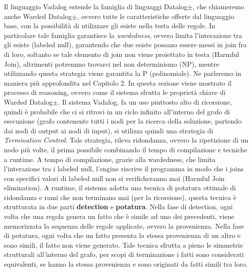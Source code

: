 Il linguaggio Vadalog estende la famiglia di linguaggi Datalog$\pm $, che chiameremo anche Warded Datalog$\pm $, ovvero tutte le caratteristiche offerte dal linguaggio base, con la possibilità di utilizzare gli esiste nella testa delle regole. \newline
In particolare tale famiglia garantisce la \textit{wardedness}, ovvero limita l'interazione tra gli esiste (labeled null), garantendo che due esiste possano essere messi in join fra di loro, soltanto se tale elemento di join non viene proiettato in testa (Harmful Join), altrimenti potremmo trovarci nel non determinismo (NP), mentre utilizzando questa strategia viene garantita la P  (polinomiale).\newline
Ne parleremo in maniera più approfondita nel Capitolo 2. \newline \newline
In questa sezione viene mostrato il processo di reasoning, ovvero come il sistema sfrutta le proprietà chiave di Warded Datalog$\pm$. \newline
Il sistema Vadalog, fa un uso piuttosto alto di ricorsione, quindi è probabile che ci si ritrovi in un ciclo infinito all'interno del grafo di esecuzione (grafo contenente tutti i nodi per la ricerca della soluzione, partendo dai nodi di output ai nodi di input), si utilizza quindi una strategia di \textit{Termination Control}. \newline
Tale strategia, rileva ridondanza, ovvero la ripetizione di un nodo più volte, il prima possibile combinando il tempo di compilazione e tecniche a runtime. \newline
A tempo di compilazione, grazie alla wardedness, che limita l'interazione tra i labeled null, l'engine riscrive il programma in modo che i joins con specifici valori di labeled null non si verificheranno mai (Harmful Join elimination). \newline
A runtime, il sistema adotta una tecnica di potatura ottimale di ridondanza e rami che non terminano mai (per la ricorsione), questa tecnica è strutturata in due parti \textbf{detection} e \textbf{potatura}. \newline
Nella fase di detection, ogni volta che una regola genera un fatto che è simile ad uno dei precedenti, viene memorizzata la sequenza delle regole applicate, ovvero la provenienza. \newline
Nella fase di potatura, ogni volta che un fatto presenta la stessa provenienza di un altro e sono simili, il fatto non viene generato. \newline
Tale tecnica sfrutta a pieno le simmetrie strutturali all'interno del grafo, per scopi di terminazione i fatti sono considerati equivalenti, se hanno la stessa provenienza e sono originati da fatti simili tra loro. 

